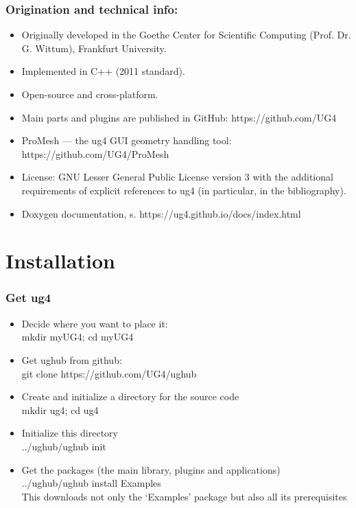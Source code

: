 \documentclass[xcolor=dvipsnames]{beamer}
\begin{document}
\begin {frame} [t]
\frametitle {Origination and technical info:}
\begin {itemize}
	\item Originally developed in the Goethe Center for Scientific Computing (Prof. Dr. G. Wittum),
	Frankfurt University.
	\pause
	\item Implemented in C++ (2011 standard).
	\pause
	\item Open-source and cross-platform.
	\pause
	\item Main parts and plugins are published in GitHub: https://github.com/UG4
	\pause
	\item ProMesh --- the ug4 GUI geometry handling tool: https://github.com/UG4/ProMesh
	\pause
	\item License: GNU Lesser General Public License version 3 with the additional requirements
		of explicit references to ug4 (in particular, in the bibliography).
	\pause
	\item Doxygen documentation, s. https://ug4.github.io/docs/index.html
\end {itemize}
\end {frame}

\section {Installation}

\begin {frame} [t]
\frametitle {Get ug4}
\vspace {-2ex}
\begin {itemize}
	\item Decide where you want to place it: \\
		{\color{blue} mkdir myUG4; cd myUG4}
	\pause
	\item Get ughub from github: \\
		{\color{blue} git clone https://github.com/UG4/ughub}
	\pause
	\item Create and initialize a directory for the source code \\
		{\color{blue} mkdir ug4; cd ug4}
	\pause
	\item Initialize this directory \\
		{\color{blue} ../ughub/ughub init}
	\pause
	\item Get the packages (the main library, plugins and applications) \\
		{\color{blue} ../ughub/ughub install Examples} \\
		This downloads not only the `Examples' package but also all its prerequisites
\end {itemize}
\end {frame}
\end{document}
